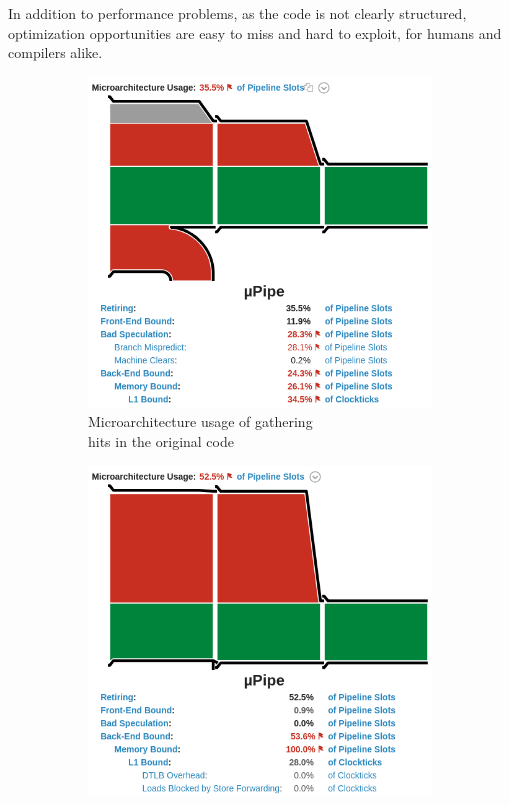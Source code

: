 \documentclass[12pt]{article}
\begin{document}
In addition to performance problems, as the code is not clearly structured, optimization opportunities are easy to miss and hard to exploit, for humans and compilers alike.

\begin{figure}[H]
	\centering
	\begin{subfigure}{.5\textwidth}
		\centering
		\includegraphics[width=\linewidth]{velout_gatherhits_orig_uarch}
		\caption{Microarchitecture usage of gathering\\ hits in the original code}
		\label{fig_velout_branch_example_sub1}
	\end{subfigure}%
	\begin{subfigure}{.5\textwidth}
		\centering
		\includegraphics[width=\linewidth]{velout_gatherhits_new_uarch}

\end{subfigure}
\end{figure}
\end{document}
